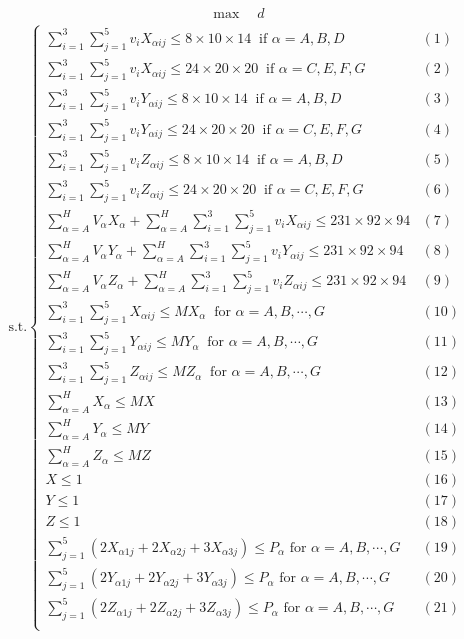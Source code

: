 \documentclass{mcmthesis}
\begin{document}
\[
\begin{aligned}
\max\quad d
\end{aligned}
\]
\[
\begin{aligned}
\text{s.t.}
\left\{
\begin{array}{lr}
\sum\limits_{i=1}^{3}\sum\limits_{j=1}^{5}v_{i}X_{\alpha ij}\le 8\times 10\times 14\ \text{ if }\alpha=A,B,D &(1)\\
\sum\limits_{i=1}^{3}\sum\limits_{j=1}^{5}v_{i}X_{\alpha ij}\le 24\times 20\times 20\ \text{ if }\alpha=C,E,F,G &(2)\\
\sum\limits_{i=1}^{3}\sum\limits_{j=1}^{5}v_{i}Y_{\alpha ij}\le 8\times 10\times 14\ \text{ if }\alpha=A,B,D &(3)\\
\sum\limits_{i=1}^{3}\sum\limits_{j=1}^{5}v_{i}Y_{\alpha ij}\le 24\times 20\times 20\ \text{ if }\alpha=C,E,F,G &(4)\\
\sum\limits_{i=1}^{3}\sum\limits_{j=1}^{5}v_{i}Z_{\alpha ij}\le 8\times 10\times 14\ \text{ if }\alpha=A,B,D &(5)\\
\sum\limits_{i=1}^{3}\sum\limits_{j=1}^{5}v_{i}Z_{\alpha ij}\le 24\times 20\times 20\ \text{ if }\alpha=C,E,F,G &(6)\\
\sum\limits_{\alpha=A}^{H}V_{\alpha}X_{\alpha}+\sum\limits_{\alpha=A}^{H}\sum\limits_{i=1}^{3}\sum\limits_{j=1}^{5}v_{i}X_{\alpha ij}\le 231\times92\times 94&(7)\\
\sum\limits_{\alpha=A}^{H}V_{\alpha}Y_{\alpha}+\sum\limits_{\alpha=A}^{H}\sum\limits_{i=1}^{3}\sum\limits_{j=1}^{5}v_{i}Y_{\alpha ij}\le 231\times92\times 94&(8)\\
\sum\limits_{\alpha=A}^{H}V_{\alpha}Z_{\alpha}+\sum\limits_{\alpha=A}^{H}\sum\limits_{i=1}^{3}\sum\limits_{j=1}^{5}v_{i}Z_{\alpha ij}\le 231\times92\times 94&(9)\\
\sum\limits_{i=1}^{3}\sum\limits_{j=1}^{5}X_{\alpha ij}\le M X_{\alpha}\ \text{ for }\alpha=A,B,\cdots, G&(10)\\
\sum\limits_{i=1}^{3}\sum\limits_{j=1}^{5}Y_{\alpha ij}\le M Y_{\alpha}\ \text{ for }\alpha=A,B,\cdots, G&(11)\\
\sum\limits_{i=1}^{3}\sum\limits_{j=1}^{5}Z_{\alpha ij}\le M Z_{\alpha}\ \text{ for }\alpha=A,B,\cdots, G&(12)\\
\sum\limits_{\alpha=A}^{H}X_\alpha\le MX&(13)\\
\sum\limits_{\alpha=A}^{H}Y_\alpha\le MY&(14)\\
\sum\limits_{\alpha=A}^{H}Z_\alpha\le MZ&(15)\\
X\le 1&(16)\\
Y\le 1&(17)\\
Z\le 1&(18)\\
\sum\limits_{j=1}^{5}\left(2X_{\alpha 1 j}+2X_{\alpha 2 j}+3X_{\alpha 3 j}\right)\le P_\alpha\text{ for }\alpha=A,B,\cdots, G&(19)\\
\sum\limits_{j=1}^{5}\left(2Y_{\alpha 1 j}+2Y_{\alpha 2 j}+3Y_{\alpha 3 j}\right)\le P_\alpha\text{ for }\alpha=A,B,\cdots, G&(20)\\
\sum\limits_{j=1}^{5}\left(2Z_{\alpha 1 j}+2Z_{\alpha 2 j}+3Z_{\alpha 3 j}\right)\le P_\alpha\text{ for }\alpha=A,B,\cdots, G&(21)\\
\end{array}
\right.
\end{aligned}
\]
\end{document}

